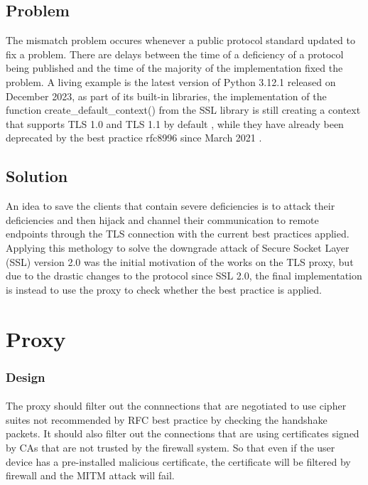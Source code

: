 \documentclass[mscthesis]{usiinfthesis}
\begin{document}
\subsection{Problem}
The mismatch problem occures whenever a public protocol standard updated to fix a problem. There are delays between the time of a deficiency of a protocol being published and the time of the majority of the implementation fixed the problem. A living example is the latest version of Python 3.12.1 released on December 2023, as part of its built-in libraries, the implementation of the function create\_default\_context() from the SSL library is still creating a context that supports TLS 1.0 and TLS 1.1 by default \citep{pyton:ssl}, while they have already been deprecated by the best practice rfc8996 since March 2021 \citep{rfc:notls11}.

\subsection{Solution}
An idea to save the clients that contain severe deficiencies is to attack their deficiencies and then hijack and channel their communication to remote endpoints through the TLS connection with the current best practices applied. Applying this methology to solve the downgrade attack of Secure Socket Layer (SSL) version 2.0 was the initial motivation of the works on the TLS proxy, but due to the drastic changes to the protocol since SSL 2.0, the final implementation is instead to use the proxy to check whether the best practice is applied.


\section{Proxy}
\subsubsection{Design}
\paragraph{}
The proxy should filter out the connnections that are negotiated to use cipher suites not recommended by RFC best practice by checking the handshake packets. It should also filter out the connections that are using certificates signed by CAs that are not trusted by the firewall system. So that even if the user device has a pre-installed malicious certificate, the certificate will be filtered by firewall and the MITM attack will fail.
\end{document}

